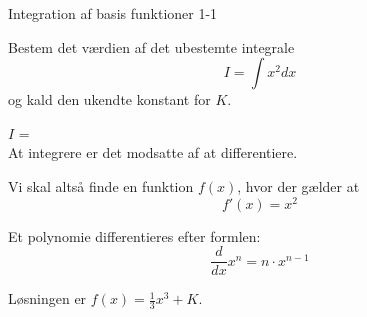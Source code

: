 \documentclass{article}
\begin{document}
\tableofcontents

\begin{exercise}{Integration af basis funktioner 1-1}

Bestem det værdien af det ubestemte integrale
\[
I = \int x^2 dx
\]
og kald den ukendte konstant for $K$.

$I$ =  \\

\hint
At integrere er det modsatte af at differentiere.

\hint
Vi skal altså finde en funktion $f(x)$, hvor der gælder at
\[
f'(x) = x^2
\]

\hint
Et polynomie differentieres efter formlen:
\[
\frac{d}{dx} x^n = n \cdot x^{n - 1}
\]

\hint
Løsningen er $f(x) = \frac{1}{3} x^3 + K$.

\end{exercise}
\end{document}

